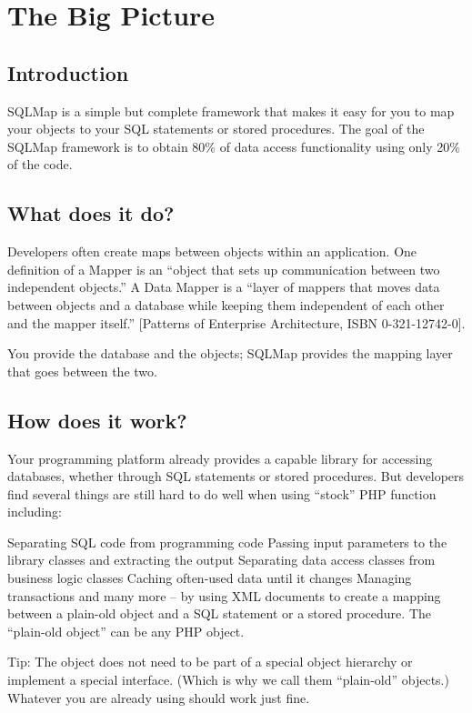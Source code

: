 \chapter{The Big Picture}
\section{Introduction}
SQLMap is a simple but complete framework that makes it easy for you to map
your objects to your SQL statements or stored procedures. The goal of the
SQLMap framework is to obtain 80\% of data access functionality using only
20\% of the code.

\section{What does it do?}
Developers often create maps between objects within an application. One
definition of a Mapper is an ``object that sets up communication between two
independent objects.'' A Data Mapper is a ``layer of mappers that moves data
between objects and a database while keeping them independent of each other
and the mapper itself.'' [Patterns of Enterprise Architecture, ISBN
0-321-12742-0].

You provide the database and the objects; SQLMap provides the mapping layer
that goes between the two.

\section{How does it work?}

Your programming platform already provides a capable library for accessing
databases, whether through SQL statements or stored procedures. But developers
find several things are still hard to do well when using ``stock'' PHP
function including:

Separating SQL code from programming code Passing input parameters to the
library classes and extracting the output Separating data access classes from
business logic classes Caching often-used data until it changes Managing
transactions and many more -- by using XML documents to create a mapping
between a plain-old object and a SQL statement or a stored procedure. The
``plain-old object'' can be any PHP object.

\begin{mybox}{Tip:}
The object does not need to be part of a special object hierarchy or implement
a special interface. (Which is why we call them ``plain-old'' objects.)
Whatever you are already using should work just fine.
\end{mybox}

